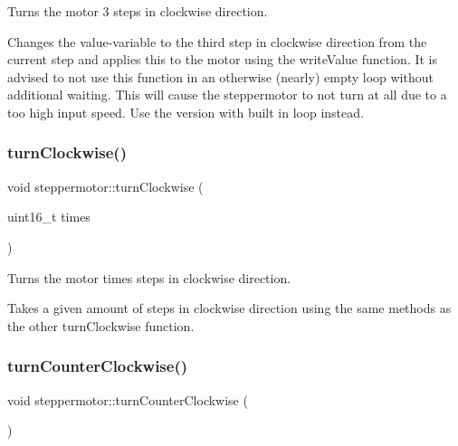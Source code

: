 Turns the motor 3 steps in clockwise direction. 

Changes the value-\/variable to the third step in clockwise direction from the current step and applies this to the motor using the write\+Value function. It is advised to not use this function in an otherwise (nearly) empty loop without additional waiting. This will cause the steppermotor to not turn at all due to a too high input speed. Use the version with built in loop instead. \mbox{\label{classsteppermotor_a62b4e62292f6b8de2f3552a5fd950d69}} 
\subsubsection{\texorpdfstring{turn\+Clockwise()}{turnClockwise()}\hspace{0.1cm}{\footnotesize\ttfamily [2/2]}}
{\footnotesize\ttfamily void steppermotor\+::turn\+Clockwise (\begin{DoxyParamCaption}\item[{uint16\+\_\+t}]{times }\end{DoxyParamCaption})\hspace{0.3cm}{\ttfamily [virtual]}}



Turns the motor \textquotesingle{}times\textquotesingle{} steps in clockwise direction. 

Takes a given amount of steps in clockwise direction using the same methods as the other turn\+Clockwise function. \mbox{\label{classsteppermotor_ab896cfadddeefadb0256b1dba3598426}} 
\subsubsection{\texorpdfstring{turn\+Counter\+Clockwise()}{turnCounterClockwise()}\hspace{0.1cm}{\footnotesize\ttfamily [1/2]}}
{\footnotesize\ttfamily void steppermotor\+::turn\+Counter\+Clockwise (\begin{DoxyParamCaption}{ }\end{DoxyParamCaption})\hspace{0.3cm}{\ttfamily [virtual]}}



